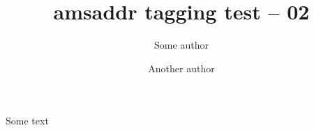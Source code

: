 \documentclass{amsart}
\title{amsaddr tagging test -- 02}
\author{Some author}
\author{Another author}
\begin{document}
\maketitle

Some text
\end{document}

